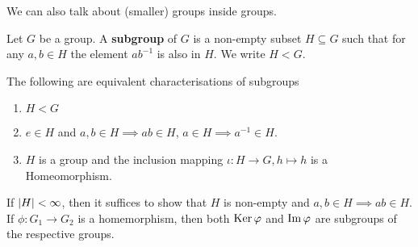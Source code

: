 We can also talk about (smaller) groups inside groups.
\begin{definition}[subgroup]
	Let $G$ be a group. A \textbf{subgroup} of $G$ is a non-empty subset $H \subseteq G$ such that for any $a,b \in H$ the element $ab^{-1}$ is also in $H$. We write $H < G$.
\end{definition}
The following are equivalent characterisations of subgroups
\begin{enumerate}
\item $H < G$
\item $e \in H$ and $a,b \in H \implies ab \in H$, $a \in H \implies a^{-1} \in H$.
\item $H$ is a group and the inclusion mapping $\iota: H \to G, h \mapsto h$ is a Homeomorphism.
\end{enumerate}
If $\vert H\vert < \infty$, then it suffices to show that $H$ is non-empty and $a,b \in H \implies ab \in H$.\\


If $\phi: G_1 \to G_2$ is a homemorphism, then both $\operatorname{Ker} \varphi$ and $\operatorname{Im} \varphi$ are subgroups of the respective groups.

